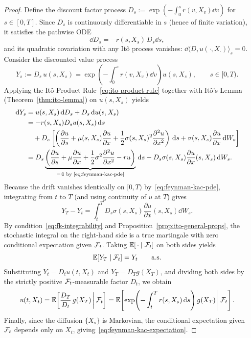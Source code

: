 \begin{proof}
Define the discount factor process $D_s := \exp\!\left(-\int_0^s r(v, X_v)\dd v\right)$ for $s \in [0, T]$. Since $D_s$ is continuously differentiable in $s$ (hence of finite variation), it satisfies the pathwise ODE
\[
\dd D_s = -r(s, X_s)\, D_s \dd s,
\]
and its quadratic covariation with any It\^o process vanishes: $\dd\langle D, u(\cdot, X_\cdot) \rangle_s = 0$. Consider the discounted value process
\[
Y_s := D_s\, u(s, X_s) = \exp\!\left(-\int_0^s r(v, X_v)\dd v\right) u(s, X_s), \qquad s \in [0, T).
\]
Applying the It\^o Product Rule~\eqref{eq:ito-product-rule} together with It\^o's Lemma (Theorem~\ref{thm:ito-lemma}) on $u(s, X_s)$ yields
\begin{align*}
\,\mathrm{d} Y_s
&= u(s, X_s)\,\mathrm{d} D_s + D_s \,\mathrm{d} u(s, X_s) \\
&= -r(s, X_s) D_s u(s, X_s)\,\mathrm{d} s \\
&\quad + D_s\left[\left(\frac{\partial u}{\partial s} + \mu(s, X_s)\frac{\partial u}{\partial x} + \frac{1}{2}\sigma(s, X_s)^2 \frac{\partial^2 u}{\partial x^2}\right)\,\mathrm{d} s + \sigma(s, X_s)\frac{\partial u}{\partial x}\,\mathrm{d} W_s\right] \\
&= D_s\underbrace{\left(\frac{\partial u}{\partial s} + \mu \frac{\partial u}{\partial x} + \frac{1}{2}\sigma^2 \frac{\partial^2 u}{\partial x^2} - r u\right)}_{=\,0 \text{ by~\eqref{eq:feynman-kac-pde}}}\,\mathrm{d} s + D_s \sigma(s, X_s)\frac{\partial u}{\partial x}(s, X_s)\,\mathrm{d} W_s.
\end{align*}
Because the drift vanishes identically on $[0, T)$ by~\eqref{eq:feynman-kac-pde}, integrating from $t$ to $T$ (and using continuity of $u$ at $T$) gives
\[
Y_T - Y_t = \int_t^T D_s \sigma(s, X_s)\frac{\partial u}{\partial x}(s, X_s)\dd W_s.
\]
By condition~\eqref{eq:fk-integrability} and Proposition~\ref{prop:ito-general-props}, the stochastic integral on the right-hand side is a true martingale with zero conditional expectation given $\mathcal{F}_t$. Taking $\mathbb{E}[\,\cdot \mid \mathcal{F}_t]$ on both sides yields
\[
\mathbb{E}[Y_T \mid \mathcal{F}_t] = Y_t \qquad \text{a.s.}
\]
Substituting $Y_t = D_t u(t, X_t)$ and $Y_T = D_T g(X_T)$, and dividing both sides by the strictly positive $\mathcal{F}_t$-measurable factor $D_t$, we obtain
\[
u(t, X_t) = \mathbb{E}\!\left[\frac{D_T}{D_t}\, g(X_T) \,\middle|\, \mathcal{F}_t\right] = \mathbb{E}\!\left[\exp\!\left(-\int_t^T r(s, X_s)\,\mathrm{d} s\right) g(X_T) \,\middle|\, \mathcal{F}_t\right].
\]
Finally, since the diffusion $\{X_s\}$ is Markovian, the conditional expectation given $\mathcal{F}_t$ depends only on $X_t$, giving~\eqref{eq:feynman-kac-expectation}.
\end{proof}

